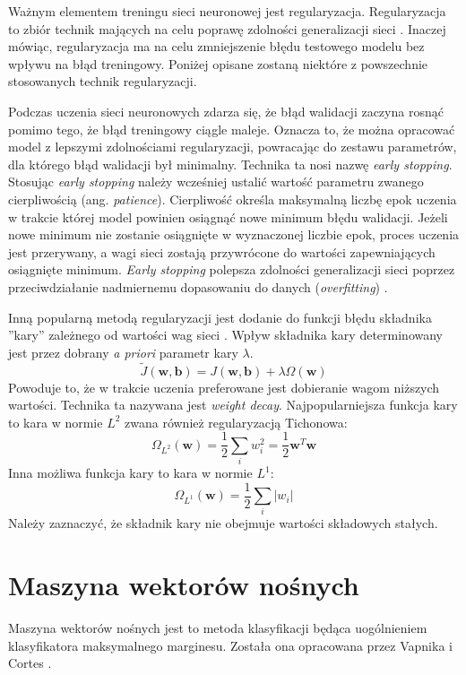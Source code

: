 \documentclass[notitlepage]{report}
\begin{document}
Ważnym elementem treningu sieci neuronowej jest regularyzacja. Regularyzacja to zbiór technik mających na celu poprawę zdolności generalizacji sieci \cite{goodfellow}. Inaczej mówiąc, regularyzacja ma na celu zmniejszenie błędu testowego modelu bez wpływu na błąd treningowy. Poniżej opisane zostaną niektóre z powszechnie stosowanych technik regularyzacji.

Podczas uczenia sieci neuronowych zdarza się, że błąd walidacji zaczyna rosnąć pomimo tego, że błąd treningowy ciągle maleje. Oznacza to, że można opracować model z lepszymi zdolnościami regularyzacji, powracając do zestawu parametrów, dla którego błąd walidacji był minimalny. Technika ta nosi nazwę \textit{early stopping}. Stosując \textit{early stopping} należy wcześniej ustalić wartość parametru zwanego cierpliwością (ang. \textit{patience}). Cierpliwość określa maksymalną liczbę epok uczenia w trakcie której model powinien osiągnąć nowe minimum błędu walidacji. Jeżeli nowe minimum nie zostanie osiągnięte w wyznaczonej liczbie epok, proces uczenia jest przerywany, a wagi sieci zostają przywrócone do wartości zapewniających osiągnięte minimum. \textit{Early stopping} polepsza zdolności generalizacji sieci poprzez przeciwdziałanie nadmiernemu dopasowaniu do danych (\textit{overfitting}) \cite{goodfellow}.  

Inną popularną metodą regularyzacji jest dodanie do funkcji błędu składnika ''kary'' zależnego od wartości wag sieci \cite{goodfellow}. Wpływ składnika kary determinowany jest przez dobrany \textit{a priori} parametr kary $\lambda$.
\begin{equation}
\tilde{J}(\mathbf{w},\mathbf{b}) = J(\mathbf{w},\mathbf{b}) + \lambda\Omega(\mathbf{w})
\end{equation}
Powoduje to, że w trakcie uczenia preferowane jest dobieranie wagom niższych wartości. Technika ta nazywana jest \textit{weight decay}. Najpopularniejsza  funkcja kary to kara w normie $L^2$ zwana również regularyzacją Tichonowa:
\begin{equation}
\Omega_{L^2}(\mathbf{w}) = \frac{1}{2}\sum_{i}^{}w_{i}^{2} = \frac{1}{2}\mathbf{w}^{T}\mathbf{w}
\end{equation}
Inna możliwa funkcja kary to kara w normie $L^1$:
\begin{equation}
\Omega_{L^1}(\mathbf{w}) = \frac{1}{2}\sum_{i}^{}|w_{i}|
\end{equation}
Należy zaznaczyć, że składnik kary nie obejmuje wartości składowych stałych.

\section{Maszyna wektorów nośnych}
Maszyna wektorów nośnych jest to metoda klasyfikacji będąca uogólnieniem klasyfikatora maksymalnego marginesu. Została ona opracowana przez Vapnika i Cortes \cite{cortes}. 
\end{document}
